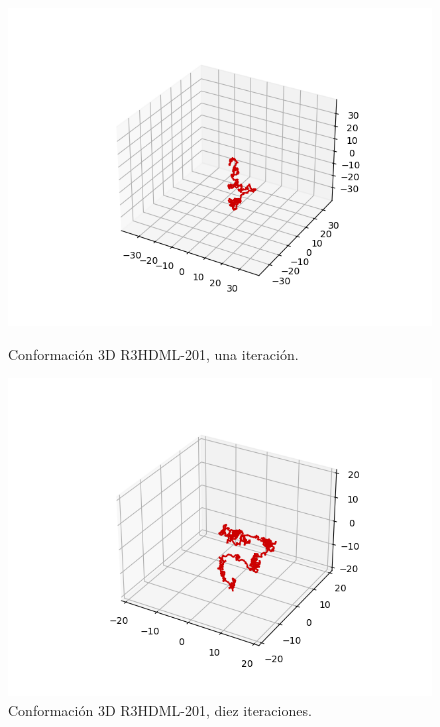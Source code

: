 \documentclass[a4paper,11pt,titlepage]{article}
\theoremstyle{definition}
\begin{document}
\begin{figure}[H]
    \centering
    \begin{minipage}[c]{0.31\textwidth}
        \centering
        \includegraphics[width=\textwidth]{images/R3HDML-201-db_one.png}
        \caption{Conformación 3D R3HDML-201, una iteración.}
        \label{fig:R3HDML-201-one}
    \end{minipage}
    \hfill
    \begin{minipage}[c]{0.31\textwidth}
        \centering
        \includegraphics[width=\textwidth]{images/R3HDML-201-db_iter.png}
        \caption{Conformación 3D R3HDML-201, diez iteraciones.}
        \label{fig:R3HDML-201-multi}
    \end{minipage}

\end{figure}
\end{document}
